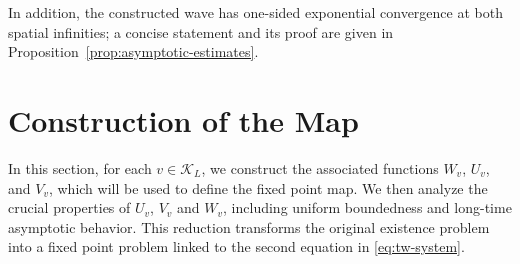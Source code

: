 \documentclass[preprint,sort&compress,final,12pt]{elsarticle}
\numberwithin{equation}{section}
\begin{document}
In addition, the constructed wave has one-sided exponential convergence at both spatial infinities; a concise statement and its proof are given in Proposition~\ref{prop:asymptotic-estimates}.


\section{Construction of the Map}\label{sec:construction}

In this section, for each $v\in\mathcal K_L$, we construct the associated functions $W_v$, $U_v$, and $V_v$, which will be used to define the fixed point map. We then analyze the crucial properties of $U_v$, $V_v$ and $W_v$, including uniform boundedness and long-time asymptotic behavior. This reduction transforms the original existence problem into a fixed point problem linked to the second equation in \eqref{eq:tw-system}.
\end{document}
